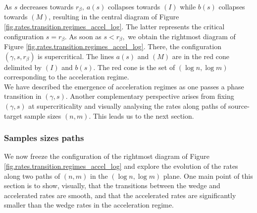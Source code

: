 \documentclass[10pt]{article}
\begin{document}
As $s$ decreases towards $r_\beta,\ a(s)$ collapses towards $(I)$ while $b(s)$ collapses towards $(M)$, resulting in the central diagram of Figure \ref{fig.rates.transition.regimes_accel_log}. The latter represents the critical configuration $s = r_\beta.$ As soon as $s < r_\beta,$ we obtain the rightmost diagram of Figure \ref{fig.rates.transition.regimes_accel_log}. There, the configuration $(\gamma, s, r_\beta)$ is supercritical. The lines $a(s)$ and $(M)$ are in the red cone delimited by $(I)$ and $b(s)$. The red cone is the set of $(\log n, \log m)$ corresponding to the acceleration regime.\\

We have described the emergence of acceleration regimes as one passes a phase transition in $(\gamma, s).$ Another complementary perspective arises from fixing $(\gamma, s)$ at supercriticality and visually analysing the rates along paths of source-target sample sizes $(n,m)$. This leads us to the next section.



\subsubsection{Samples sizes paths}
\label{sec.3.2.3}
We now freeze the configuration of the rightmost diagram of Figure \ref{fig.rates.transition.regimes_accel_log} and explore the evolution of the rates along two paths of $(n,m)$ in the $(\log n, \log m)$ plane. One main point of this section is to show, visually, that the transitions between the wedge and accelerated rates are smooth, and that the accelerated rates are significantly smaller than the wedge rates in the acceleration regime.\\
\end{document}
